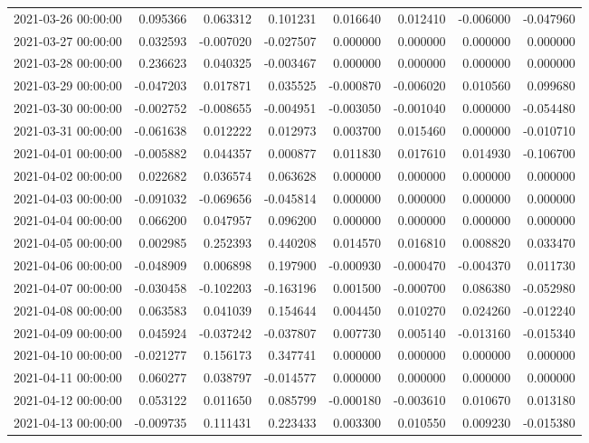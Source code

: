 \begin{tabular}{lrrrrrrr}
2021-03-26 00:00:00 & 0.095366 & 0.063312 & 0.101231 & 0.016640 & 0.012410 & -0.006000 & -0.047960 \\
2021-03-27 00:00:00 & 0.032593 & -0.007020 & -0.027507 & 0.000000 & 0.000000 & 0.000000 & 0.000000 \\
2021-03-28 00:00:00 & 0.236623 & 0.040325 & -0.003467 & 0.000000 & 0.000000 & 0.000000 & 0.000000 \\
2021-03-29 00:00:00 & -0.047203 & 0.017871 & 0.035525 & -0.000870 & -0.006020 & 0.010560 & 0.099680 \\
2021-03-30 00:00:00 & -0.002752 & -0.008655 & -0.004951 & -0.003050 & -0.001040 & 0.000000 & -0.054480 \\
2021-03-31 00:00:00 & -0.061638 & 0.012222 & 0.012973 & 0.003700 & 0.015460 & 0.000000 & -0.010710 \\
2021-04-01 00:00:00 & -0.005882 & 0.044357 & 0.000877 & 0.011830 & 0.017610 & 0.014930 & -0.106700 \\
2021-04-02 00:00:00 & 0.022682 & 0.036574 & 0.063628 & 0.000000 & 0.000000 & 0.000000 & 0.000000 \\
2021-04-03 00:00:00 & -0.091032 & -0.069656 & -0.045814 & 0.000000 & 0.000000 & 0.000000 & 0.000000 \\
2021-04-04 00:00:00 & 0.066200 & 0.047957 & 0.096200 & 0.000000 & 0.000000 & 0.000000 & 0.000000 \\
2021-04-05 00:00:00 & 0.002985 & 0.252393 & 0.440208 & 0.014570 & 0.016810 & 0.008820 & 0.033470 \\
2021-04-06 00:00:00 & -0.048909 & 0.006898 & 0.197900 & -0.000930 & -0.000470 & -0.004370 & 0.011730 \\
2021-04-07 00:00:00 & -0.030458 & -0.102203 & -0.163196 & 0.001500 & -0.000700 & 0.086380 & -0.052980 \\
2021-04-08 00:00:00 & 0.063583 & 0.041039 & 0.154644 & 0.004450 & 0.010270 & 0.024260 & -0.012240 \\
2021-04-09 00:00:00 & 0.045924 & -0.037242 & -0.037807 & 0.007730 & 0.005140 & -0.013160 & -0.015340 \\
2021-04-10 00:00:00 & -0.021277 & 0.156173 & 0.347741 & 0.000000 & 0.000000 & 0.000000 & 0.000000 \\
2021-04-11 00:00:00 & 0.060277 & 0.038797 & -0.014577 & 0.000000 & 0.000000 & 0.000000 & 0.000000 \\
2021-04-12 00:00:00 & 0.053122 & 0.011650 & 0.085799 & -0.000180 & -0.003610 & 0.010670 & 0.013180 \\
2021-04-13 00:00:00 & -0.009735 & 0.111431 & 0.223433 & 0.003300 & 0.010550 & 0.009230 & -0.015380 \\

\end{tabular}
